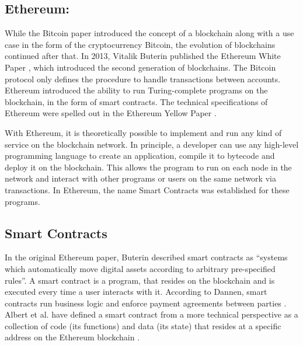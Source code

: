 \documentclass[10pt,conference]{IEEEtran}
\begin{document}
	\subsection{Ethereum:}
	
	While the Bitcoin paper introduced the concept of a blockchain along with a use case in the form of the cryptocurrency Bitcoin, the evolution of blockchains continued after that. In 2013, Vitalik Buterin published the Ethereum White Paper \cite{ethpaper}, which introduced the second generation of blockchains. The Bitcoin protocol only defines the procedure to handle transactions between accounts. Ethereum introduced the ability to run Turing-complete programs on the blockchain, in the form of smart contracts. The technical specifications of Ethereum were spelled out in the Ethereum Yellow Paper \cite{wood2019ethereum}.
	
	With Ethereum, it is theoretically possible to implement and run any kind of service on the blockchain network. In principle, a developer can use any high-level programming language to create an application, compile it to bytecode and deploy it on the blockchain. This allows the program to run on each node in the network and interact with other programs or users on the same network via transactions. In Ethereum, the name Smart Contracts was established for these programs.
	
	\subsection{Smart Contracts}
	In the original Ethereum paper, Buterin described smart contracts as ``systems which automatically move digital assets according to arbitrary pre-specified rules''\cite{ethpaper}. A smart contract is a program, that resides on the blockchain and is executed every time a user interacts with it. According to Dannen, smart contracts run business logic and enforce payment agreements between parties \cite{bitcoinbook}. Albert et al. have defined a smart contract from a more technical perspective as a collection of code (its functions) and data (its state) that resides at a specific address on the Ethereum blockchain \cite{gasol}. 
	
\end{document}
